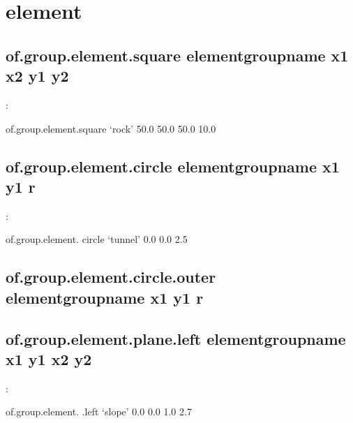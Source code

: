 \documentclass[letterpaper,10pt,english]{sphinxmanual}
\begin{document}
\section{element}
\label{\detokenize{rst_tutorials/command_line_guide:element-1}}\label{\detokenize{rst_tutorials/command_line_guide:id1}}

\subsection{of.group.element.square elementgroupname x1 x2 y1 y2}
\label{\detokenize{rst_tutorials/command_line_guide:of-group-element-square-elementgroupname-x1-x2-y1-y2}}
:

\begin{sphinxVerbatim}[commandchars=\\\{\}]
of.group.element.square ‘rock’ \PYGZhy{}50.0 50.0 \PYGZhy{}50.0 10.0
\end{sphinxVerbatim}


\subsection{of.group.element.circle elementgroupname x1 y1 r}
\label{\detokenize{rst_tutorials/command_line_guide:of-group-element-circle-elementgroupname-x1-y1-r}}
:

\begin{sphinxVerbatim}[commandchars=\\\{\}]
of.group.element. circle ‘tunnel’ 0.0 0.0 2.5
\end{sphinxVerbatim}


\subsection{of.group.element.circle.outer elementgroupname x1 y1 r}
\label{\detokenize{rst_tutorials/command_line_guide:of-group-element-circle-outer-elementgroupname-x1-y1-r}}

\subsection{of.group.element.plane.left elementgroupname x1 y1 x2 y2}
\label{\detokenize{rst_tutorials/command_line_guide:of-group-element-plane-left-elementgroupname-x1-y1-x2-y2}}
:

\begin{sphinxVerbatim}[commandchars=\\\{\}]
of.group.element. .left ‘slope’ 0.0 0.0 1.0 2.7
\end{sphinxVerbatim}
\end{document}
